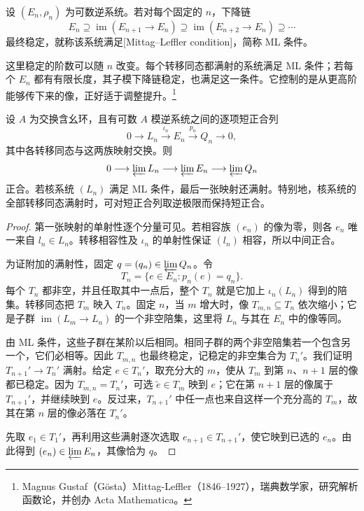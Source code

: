 \begin{definition}\label{g5:def:mittag-leffler}
	设 \((E_n,\rho_n)\) 为可数逆系统。若对每个固定的 \(n\)，下降链
	\[
		E_n\supseteq\operatorname{im}(E_{n+1}\to E_n)
		\supseteq\operatorname{im}(E_{n+2}\to E_n)\supseteq\cdots
	\]
	最终稳定，就称该系统满足[Mittag–Leffler condition]，简称 ML 条件。
\end{definition}

这里稳定的阶数可以随 \(n\) 改变。每个转移同态都满射的系统满足 ML 条件；若每个 \(E_n\) 都有有限长度，其子模下降链稳定，也满足这一条件。它控制的是从更高阶能够传下来的像，正好适于调整提升。\footnote{Magnus Gustaf（Gösta）Mittag-Leffler（1846--1927），瑞典数学家，研究解析函数论，并创办 Acta Mathematica。}

\begin{lemma}\label{g5:lem:inverse-limit-exact}
	设 \(A\) 为交换含幺环，且有可数 \(A\) 模逆系统之间的逐项短正合列
	\[
		0\longrightarrow L_n\xrightarrow{\iota_n}E_n
		\xrightarrow{p_n}Q_n\longrightarrow0,
	\]
	其中各转移同态与这两族映射交换。则
	\[
		0\longrightarrow\varprojlim L_n
		\longrightarrow\varprojlim E_n
		\longrightarrow\varprojlim Q_n
	\]
	正合。若核系统 \((L_n)\) 满足 ML 条件，最后一张映射还满射。特别地，核系统的全部转移同态满射时，可对短正合列取逆极限而保持短正合。
\end{lemma}
\begin{proof}
	第一张映射的单射性逐个分量可见。若相容族 \((e_n)\) 的像为零，则各 \(e_n\) 唯一来自 \(l_n\in L_n\)。转移相容性及 \(\iota_n\) 的单射性保证 \((l_n)\) 相容，所以中间正合。

	为证附加的满射性，固定 \(q=(q_n)\in\varprojlim Q_n\)。令
	\[
		T_n=\{e\in E_n:p_n(e)=q_n\}.
	\]
	每个 \(T_n\) 都非空，并且任取其中一点后，整个 \(T_n\) 就是它加上 \(\iota_n(L_n)\) 得到的陪集。转移同态把 \(T_m\) 映入 \(T_n\)。固定 \(n\)，当 \(m\) 增大时，像 \(T_{m,n}\subseteq T_n\) 依次缩小；它是子群 \(\operatorname{im}(L_m\to L_n)\) 的一个非空陪集，这里将 \(L_n\) 与其在 \(E_n\) 中的像等同。

	由 ML 条件，这些子群在某阶以后相同。相同子群的两个非空陪集若一个包含另一个，它们必相等。因此 \(T_{m,n}\) 也最终稳定，记稳定的非空集合为 \(T_n'\)。我们证明 \(T_{n+1}'\to T_n'\) 满射。给定 \(e\in T_n'\)，取充分大的 \(m\)，使从 \(T_m\) 到第 \(n\)、\(n+1\) 层的像都已稳定。因为 \(T_{m,n}=T_n'\)，可选 \(\widetilde e\in T_m\) 映到 \(e\)；它在第 \(n+1\) 层的像属于 \(T_{n+1}'\)，并继续映到 \(e\)。反过来，\(T_{n+1}'\) 中任一点也来自这样一个充分高的 \(T_m\)，故其在第 \(n\) 层的像必落在 \(T_n'\)。

	先取 \(e_1\in T_1'\)，再利用这些满射逐次选取 \(e_{n+1}\in T_{n+1}'\)，使它映到已选的 \(e_n\)。由此得到 \((e_n)\in\varprojlim E_n\)，其像恰为 \(q\)。
\end{proof}

